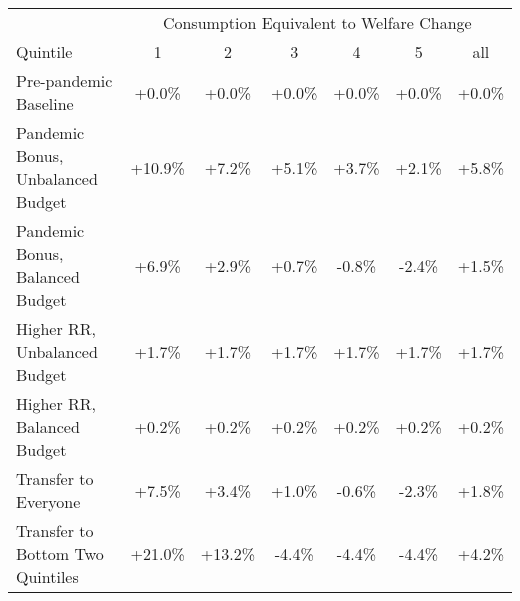 \begin{center}
\begin{adjustbox}{width=\textwidth}
\begin{tabular}{lcccccc}\toprule
 & \multicolumn{6}{c}{Consumption Equivalent to Welfare Change} \\
\cline{2-7}
Quintile & 1 & 2 & 3 & 4 & 5 & all \\
\midrule
Pre-pandemic Baseline & +0.0\% & +0.0\% & +0.0\% & +0.0\% & +0.0\% & +0.0\% \\
Pandemic Bonus, Unbalanced Budget & +10.9\% & +7.2\% & +5.1\% & +3.7\% & +2.1\% & +5.8\% \\
Pandemic Bonus, Balanced Budget & +6.9\% & +2.9\% & +0.7\% & -0.8\% & -2.4\% & +1.5\% \\
Higher RR, Unbalanced Budget & +1.7\% & +1.7\% & +1.7\% & +1.7\% & +1.7\% & +1.7\% \\
Higher RR, Balanced Budget & +0.2\% & +0.2\% & +0.2\% & +0.2\% & +0.2\% & +0.2\% \\
Transfer to Everyone & +7.5\% & +3.4\% & +1.0\% & -0.6\% & -2.3\% & +1.8\% \\
Transfer to Bottom Two Quintiles & +21.0\% & +13.2\% & -4.4\% & -4.4\% & -4.4\% & +4.2\% \\
\bottomrule\end{tabular}
\end{adjustbox}
\end{center}